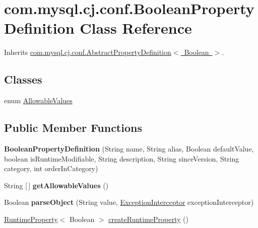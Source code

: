 \hypertarget{classcom_1_1mysql_1_1cj_1_1conf_1_1_boolean_property_definition}{}\section{com.\+mysql.\+cj.\+conf.\+Boolean\+Property\+Definition Class Reference}
\label{classcom_1_1mysql_1_1cj_1_1conf_1_1_boolean_property_definition}


Inherits \mbox{\hyperlink{classcom_1_1mysql_1_1cj_1_1conf_1_1_abstract_property_definition}{com.\+mysql.\+cj.\+conf.\+Abstract\+Property\+Definition$<$ Boolean $>$}}.

\subsection*{Classes}
\begin{DoxyCompactItemize}
\item 
enum \mbox{\hyperlink{enumcom_1_1mysql_1_1cj_1_1conf_1_1_boolean_property_definition_1_1_allowable_values}{Allowable\+Values}}
\end{DoxyCompactItemize}
\subsection*{Public Member Functions}
\begin{DoxyCompactItemize}
\item 
\mbox{\label{classcom_1_1mysql_1_1cj_1_1conf_1_1_boolean_property_definition_ab76b95e077b6aaa03c831612b67e624d}} 
{\bfseries Boolean\+Property\+Definition} (String name, String alias, Boolean default\+Value, boolean is\+Runtime\+Modifiable, String description, String since\+Version, String category, int order\+In\+Category)
\item 
\mbox{\label{classcom_1_1mysql_1_1cj_1_1conf_1_1_boolean_property_definition_ad456fe5acb34798b759e12aad98cb0b9}} 
String \mbox{[}$\,$\mbox{]} {\bfseries get\+Allowable\+Values} ()
\item 
\mbox{\label{classcom_1_1mysql_1_1cj_1_1conf_1_1_boolean_property_definition_a8e046d48d44a9e26469191e21df2efdc}} 
Boolean {\bfseries parse\+Object} (String value, \mbox{\hyperlink{interfacecom_1_1mysql_1_1cj_1_1exceptions_1_1_exception_interceptor}{Exception\+Interceptor}} exception\+Interceptor)
\item 
\mbox{\hyperlink{interfacecom_1_1mysql_1_1cj_1_1conf_1_1_runtime_property}{Runtime\+Property}}$<$ Boolean $>$ \mbox{\hyperlink{classcom_1_1mysql_1_1cj_1_1conf_1_1_boolean_property_definition_aeef0dd2eab9af91012ae5539eab40774}{create\+Runtime\+Property}} ()
\end{DoxyCompactItemize}


